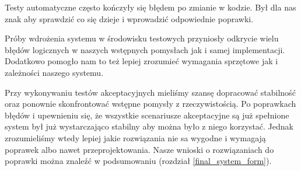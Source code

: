 \documentclass[../analiza-rozwiazania.tex]{subfiles}
\begin{document}
Testy automatyczne często kończyły się błędem po zmianie w kodzie.
Był dla nas znak aby sprawdzić co się dzieje i wprowadzić odpowiednie poprawki.

Próby wdrożenia systemu w środowisku testowych przyniosły odkrycie wielu błędów logicznych w naszych wstępnych pomysłach jak i samej implementacji.
Dodatkowo pomogło nam to też lepiej zrozumieć wymagania sprzętowe jak i zależności naszego systemu.

Przy wykonywaniu testów akceptacyjnych mieliśmy szansę dopracować stabilność oraz ponownie skonfrontować wstępne pomysły z rzeczywistością.
Po poprawkach błędów i upewnieniu się, że wszystkie scenariusze akceptacyjne są już spełnione system był już wystarczająco stabilny aby można było z niego korzystać.
Jednak zrozumieliśmy wtedy lepiej jakie rozwiązania nie sa wygodne i wymagają poprawek albo nawet przeprojektowania.
Nasze wnioski o rozwiązaniach do poprawki można znaleźć w podsumowaniu (rozdział \ref{final_system_form}).
\end{document}
